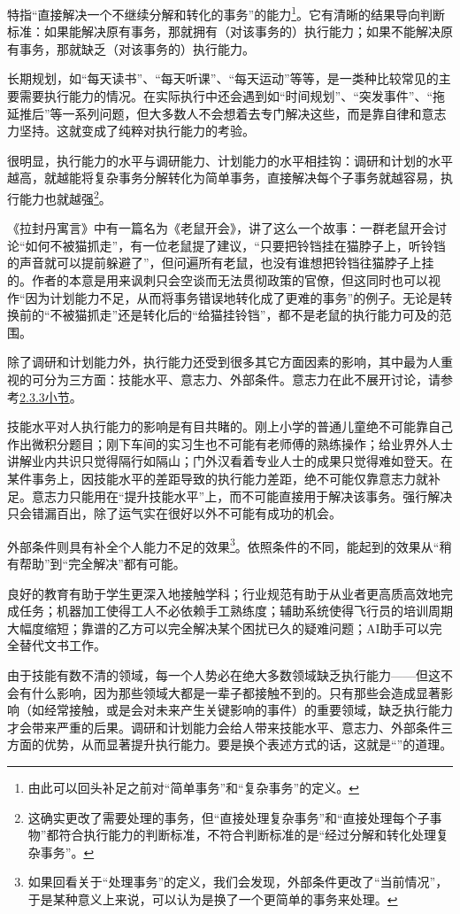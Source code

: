 特指“直接解决一个不继续分解和转化的事务”的能力\footnote{由此可以回头补足之前对“简单事务”和“复杂事务”的定义。}。它有清晰的结果导向判断标准：如果能解决原有事务，那就拥有（对该事务的）执行能力；如果不能解决原有事务，那就缺乏（对该事务的）执行能力。
\begin{examples}
长期规划，如“每天读书”、“每天听课”、“每天运动”等等，是一类种比较常见的主要需要执行能力的情况。在实际执行中还会遇到如“时间规划”、“突发事件”、“拖延推后”等一系列问题，但大多数人不会想着去专门解决这些，而是靠自律和意志力坚持。这就变成了纯粹对执行能力的考验。
\end{examples}
很明显，执行能力的水平与调研能力、计划能力的水平相挂钩：调研和计划的水平越高，就越能将复杂事务分解转化为简单事务，直接解决每个子事务就越容易，执行能力也就越强\footnote{这确实更改了需要处理的事务，但“直接处理复杂事务”和“直接处理每个子事物”都符合执行能力的判断标准，不符合判断标准的是“经过分解和转化处理复杂事务”。}。
\begin{examples}
《拉封丹寓言》中有一篇名为《老鼠开会》，讲了这么一个故事：一群老鼠开会讨论“如何不被猫抓走”，有一位老鼠提了建议，“只要把铃铛挂在猫脖子上，听铃铛的声音就可以提前躲避了”，但问遍所有老鼠，也没有谁想把铃铛往猫脖子上挂的。作者的本意是用来讽刺只会空谈而无法贯彻政策的官僚，但这同时也可以视作“因为计划能力不足，从而将事务错误地转化成了更难的事务”的例子。无论是转换前的“不被猫抓走”还是转化后的“给猫挂铃铛”，都不是老鼠的执行能力可及的范围。
\end{examples}
除了调研和计划能力外，执行能力还受到很多其它方面因素的影响，其中最为人重视的可分为三方面：技能水平、意志力、外部条件。意志力在此不展开讨论，请参考\hyperref[def:意志力]{2.3.3小节}。
\begin{examples}
技能水平对人执行能力的影响是有目共睹的。刚上小学的普通儿童绝不可能靠自己作出微积分题目；刚下车间的实习生也不可能有老师傅的熟练操作；给业界外人士讲解业内共识只觉得隔行如隔山；门外汉看着专业人士的成果只觉得难如登天。在某件事务上，因技能水平的差距导致的执行能力差距，绝不可能仅靠意志力就补足。意志力只能用在“提升技能水平”上，而不可能直接用于解决该事务。强行解决只会错漏百出，除了运气实在很好以外不可能有成功的机会。
\end{examples}
外部条件则具有补全个人能力不足的效果\footnote{如果回看关于“处理事务”的定义，我们会发现，外部条件更改了“当前情况”，于是某种意义上来说，可以认为是换了一个更简单的事务来处理。}。依照条件的不同，能起到的效果从“稍有帮助”到“完全解决”都有可能。
\begin{examples}
良好的教育有助于学生更深入地接触学科；行业规范有助于从业者更高质高效地完成任务；机器加工使得工人不必依赖手工熟练度；辅助系统使得飞行员的培训周期大幅度缩短；靠谱的乙方可以完全解决某个困扰已久的疑难问题；AI助手可以完全替代文书工作。
\end{examples}
由于技能有数不清的领域，每一个人势必在绝大多数领域缺乏执行能力——但这不会有什么影响，因为那些领域大都是一辈子都接触不到的。只有那些会造成显著影响（如经常接触，或是会对未来产生关键影响的事件）的重要领域，缺乏执行能力才会带来严重的后果。调研和计划能力会给人带来技能水平、意志力、外部条件三方面的优势，从而显著提升执行能力。要是换个表述方式的话，这就是“”的道理。

